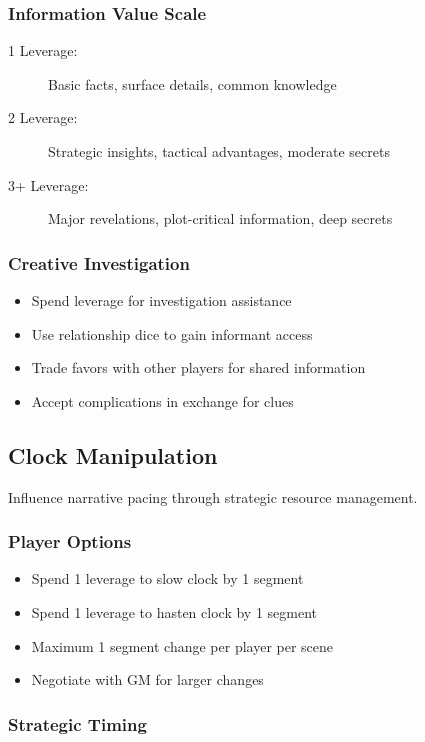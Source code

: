 \subsubsection{Information Value Scale}

\begin{description}
\item[1 Leverage:] Basic facts, surface details, common knowledge
\item[2 Leverage:] Strategic insights, tactical advantages, moderate secrets
\item[3+ Leverage:] Major revelations, plot-critical information, deep secrets
\end{description}

\subsubsection{Creative Investigation}

\begin{itemize}
\item Spend leverage for investigation assistance
\item Use relationship dice to gain informant access
\item Trade favors with other players for shared information
\item Accept complications in exchange for clues
\end{itemize}

\subsection{Clock Manipulation}

Influence narrative pacing through strategic resource management.

\subsubsection{Player Options}

\begin{itemize}
\item Spend 1 leverage to slow clock by 1 segment
\item Spend 1 leverage to hasten clock by 1 segment
\item Maximum 1 segment change per player per scene
\item Negotiate with GM for larger changes
\end{itemize}

\subsubsection{Strategic Timing}


